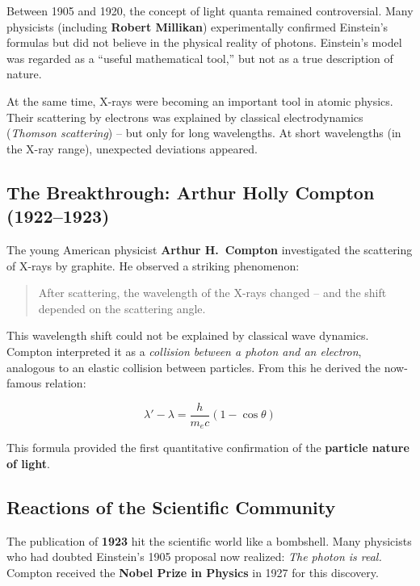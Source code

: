 Between 1905 and 1920, the concept of light quanta remained controversial. 
Many physicists (including \textbf{Robert Millikan}) experimentally confirmed Einstein’s formulas but did not believe in the physical reality of photons.  
Einstein’s model was regarded as a “useful mathematical tool,” but not as a true description of nature.

At the same time, X-rays were becoming an important tool in atomic physics.  
Their scattering by electrons was explained by classical electrodynamics (\emph{Thomson scattering}) – but only for long wavelengths.  
At short wavelengths (in the X-ray range), unexpected deviations appeared.

\vspace{1em}
\subsection{The Breakthrough: Arthur Holly Compton (1922–1923)}

The young American physicist \textbf{Arthur H.~Compton} investigated the scattering of X-rays by graphite.  
He observed a striking phenomenon:

\begin{quote}
	After scattering, the wavelength of the X-rays changed – and the shift depended on the scattering angle.
\end{quote}

This wavelength shift could not be explained by classical wave dynamics.  
Compton interpreted it as a \emph{collision between a photon and an electron}, analogous to an elastic collision between particles.  
From this he derived the now-famous relation:

\[
\lambda' - \lambda = \frac{h}{m_e c}(1 - \cos\theta)
\]

This formula provided the first quantitative confirmation of the \textbf{particle nature of light}.

\vspace{1em}
\subsection{Reactions of the Scientific Community}

The publication of \textbf{1923} hit the scientific world like a bombshell.  
Many physicists who had doubted Einstein’s 1905 proposal now realized: \emph{The photon is real.}  
Compton received the \textbf{Nobel Prize in Physics} in 1927 for this discovery.  

